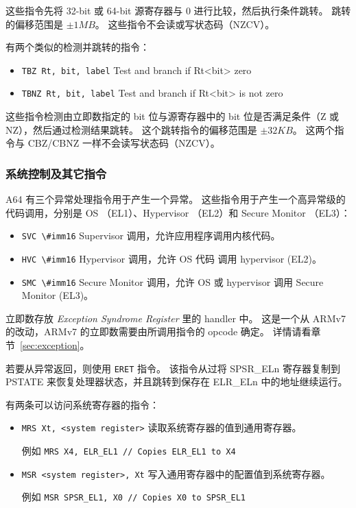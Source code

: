 这些指令先将 32-bit 或 64-bit 源寄存器与 0 进行比较，然后执行条件跳转。
跳转的偏移范围是 $\pm1MB$。
这些指令不会读或写状态码（NZCV）。

有两个类似的检测并跳转的指令：

\begin{itemize}
  \item \lstinline!TBZ Rt, bit, label! \quad Test and branch if Rt<bit> zero
  \item \lstinline!TBNZ Rt, bit, label! \quad Test and branch if Rt<bit> is not zero
\end{itemize}

这些指令检测由立即数指定的 bit 位与源寄存器中的 bit 位是否满足条件（Z 或 NZ），然后通过检测结果跳转。
这个跳转指令的偏移范围是 $\pm32KB$。
这两个指令与 CBZ/CBNZ 一样不会读写状态码（NZCV）。

\subsubsection{系统控制及其它指令}


A64 有三个异常处理指令用于产生一个异常。
这些指令用于产生一个高异常级的代码调用，分别是 OS （EL1）、Hypervisor （EL2）和 Secure Monitor （EL3）：

\begin{itemize}
  \item \lstinline!SVC \#imm16! \quad Supervisor 调用，允许应用程序调用内核代码。
  \item \lstinline!HVC \#imm16! \quad Hypervisor 调用，允许 OS 代码 调用 hypervisor (EL2)。
  \item \lstinline!SMC \#imm16! \quad Secure Monitor 调用，允许 OS 或 hypervisor 调用 Secure Monitor (EL3)。
\end{itemize}

立即数存放 \textit{Exception Syndrome Register} 里的 handler 中。
这是一个从 ARMv7 的改动，ARMv7 的立即数需要由所调用指令的 opcode 确定。
详情请看章节~\ref{sec:exception}。

若要从异常返回，则使用 \lstinline!ERET! 指令。
该指令从过将 SPSR\_ELn 寄存器复制到 PSTATE 来恢复处理器状态，并且跳转到保存在 ELR\_ELn 中的地址继续运行。


有两条可以访问系统寄存器的指令：
\begin{itemize}
  \item \lstinline!MRS Xt, <system register>! \quad 读取系统寄存器的值到通用寄存器。

    例如 \lstinline!MRS X4, ELR_EL1 // Copies ELR_EL1 to X4!
  \item \lstinline!MSR <system register>, Xt! \quad 写入通用寄存器中的配置值到系统寄存器。

    例如 \lstinline!MSR SPSR_EL1, X0 // Copies X0 to SPSR_EL1!
\end{itemize}

